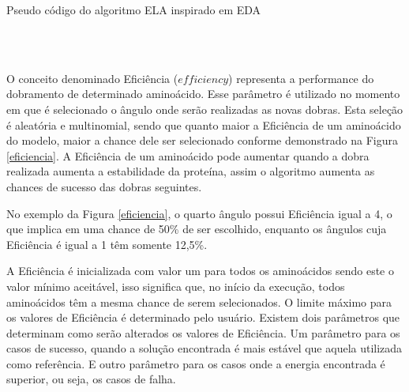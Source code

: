 \documentclass[dm,ppgcomp]{texfurg}
\begin{document}
\begin{algorithm}
  \caption{Pseudo código do algoritmo ELA inspirado em EDA}\label{elaalg}
  \begin{algorithmic}
  \ENDFOR
  \ENDFOR
    \ENDFOR
    \ENDFOR
      \ENDIF
    \ENDFOR
    \\
  \ENDWHILE
  \\
  \end{algorithmic}
\end{algorithm}

O conceito denominado Eficiência ($efficiency$) representa a performance do dobramento de determinado aminoácido. Esse parâmetro é utilizado no momento em que é selecionado o ângulo onde serão realizadas as novas dobras. Esta seleção é aleatória e multinomial, sendo que quanto maior a Eficiência de um aminoácido do modelo, maior a chance dele ser selecionado conforme demonstrado na Figura \ref{eficiencia}. A Eficiência de um aminoácido pode aumentar quando a dobra realizada aumenta a estabilidade da proteína, assim o algoritmo aumenta as chances de sucesso das dobras seguintes. 

No exemplo da Figura \ref{eficiencia}, o quarto ângulo possui Eficiência igual a 4, o que implica em uma chance de 50\% de ser escolhido, enquanto os ângulos cuja Eficiência é igual a 1 têm somente 12,5\%.

A Eficiência é inicializada com valor um para todos os aminoácidos sendo este o valor mínimo aceitável, isso significa que, no início da execução, todos aminoácidos têm a mesma chance de serem selecionados. O limite máximo para os valores de Eficiência é determinado pelo usuário. Existem dois parâmetros que determinam como serão alterados os valores de Eficiência. Um parâmetro para os casos de sucesso, quando a solução encontrada é mais estável que aquela utilizada como referência. E outro parâmetro para os casos onde a energia encontrada é superior, ou seja, os casos de falha.
\end{document}
